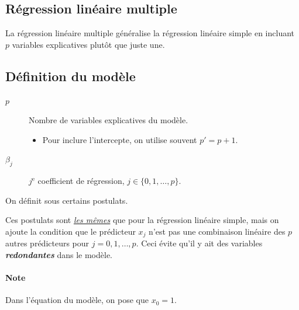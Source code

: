 \documentclass[french]{article}
\begin{document}
\begin{multicols*}{2}
\newpage
\section{Régression linéaire multiple}\label{sec:MLR}
\begin{rappel_enhanced}[Contexte]
La régression linéaire multiple généralise la régression linéaire simple en incluant $p$ variables explicatives plutôt que juste une.
\end{rappel_enhanced}


\subsection{Définition du modèle}
\begin{distributions}[Notation]
\begin{description}
	\item[$p$]	Nombre de variables explicatives du modèle.
		\begin{itemize}
		\item	Pour inclure l'intercepte, on utilise souvent $p' = p + 1$.
		\end{itemize}
	\item[$\beta_{j}$]	$j^{\text{e}}$ coefficient de régression, $j \in \{0, 1, \dots, p\}$.
\end{description}
\end{distributions}

\begin{definitionNOHFILL}
On définit  sous certains postulats. 

\bigskip

Ces postulats sont \textit{\color{bleudefrance}\underline{\hyperlink{postulatsSLR}{\color{bleudefrance} les mêmes}}} que pour la régression linéaire simple, mais on ajoute la condition que le prédicteur $x_{j}$ n'est pas une combinaison linéaire des $p$ autres prédicteurs pour $j = 0, 1, \dots, p$. Ceci évite qu'il y ait des variables \textbf{\textit{redondantes}} dans le modèle.
\end{definitionNOHFILL}

\paragraph{Note}	Dans l'équation du modèle, on pose que $x_{0} = 1$.



\columnbreak

\end{multicols*}
\end{document}
